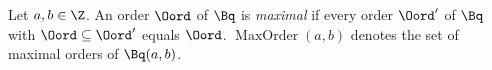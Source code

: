 Let $a,b\in\Z$. An order $\Oord$ of $\Bq$ is \emph{maximal} if every order $\Oord'$ of $\Bq$ with $\Oord\subseteq\Oord'$ equals $\Oord$.
$\operatorname{MaxOrder}(a,b)$ denotes the set of maximal orders of $\Bq(a,b)$.
